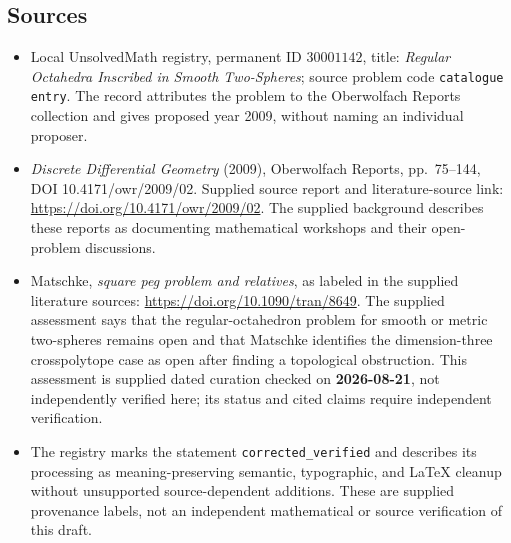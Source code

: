 \documentclass[11pt]{article}
\begin{document}
\subsection{Sources}
\begin{itemize}
\item Local UnsolvedMath registry, permanent ID \(30001142\), title: \emph{Regular Octahedra Inscribed in Smooth Two-Spheres}; source problem code \texttt{catalogue entry}. The record attributes the problem to the Oberwolfach Reports collection and gives proposed year 2009, without naming an individual proposer.
\item \emph{Discrete Differential Geometry} (2009), Oberwolfach Reports, pp.\ 75--144, DOI 10.4171/owr/2009/02. Supplied source report and literature-source link: \url{https://doi.org/10.4171/owr/2009/02}. The supplied background describes these reports as documenting mathematical workshops and their open-problem discussions.
\item Matschke, \emph{square peg problem and relatives}, as labeled in the supplied literature sources: \url{https://doi.org/10.1090/tran/8649}. The supplied assessment says that the regular-octahedron problem for smooth or metric two-spheres remains open and that Matschke identifies the dimension-three crosspolytope case as open after finding a topological obstruction. This assessment is supplied dated curation checked on \textbf{2026-08-21}, not independently verified here; its status and cited claims require independent verification.
\item The registry marks the statement \texttt{corrected\_verified} and describes its processing as meaning-preserving semantic, typographic, and LaTeX cleanup without unsupported source-dependent additions. These are supplied provenance labels, not an independent mathematical or source verification of this draft.
\end{itemize}
\end{document}
